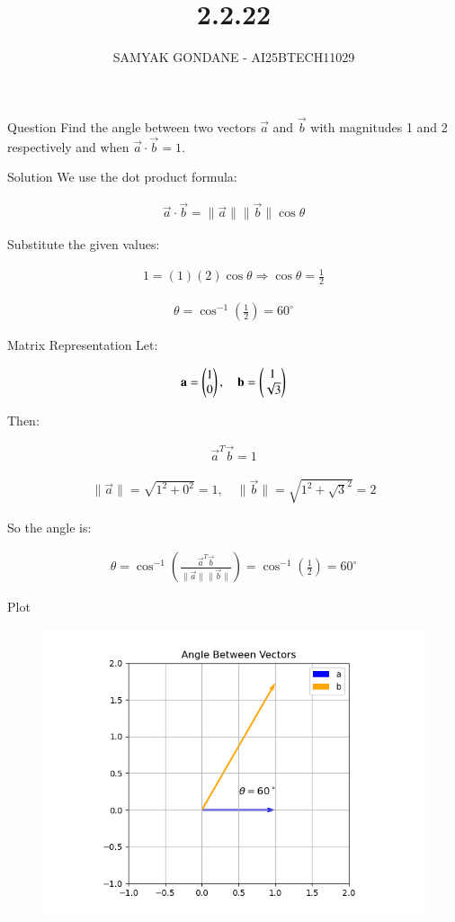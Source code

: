 \documentclass{beamer}
\title 
{2.2.22}
\date{}
\author
{SAMYAK GONDANE - AI25BTECH11029}
\begin{document}
\frame{\titlepage}

\begin{frame}{Question}
Find the angle between two vectors $\vec{a}$ and $\vec{b}$ with magnitudes 1 and 2 respectively and when $\vec{a} \cdot \vec{b} = 1$.
\end{frame}

\begin{frame}{Solution}
We use the dot product formula:


\begin{align}
\vec{a} \cdot \vec{b} = \|\vec{a}\| \|\vec{b}\| \cos\theta
\end{align}


Substitute the given values:


\begin{align}
1 = (1)(2)\cos\theta \Rightarrow \cos\theta = \frac{1}{2}
\end{align}




\begin{align}
\theta = \cos^{-1}\left(\frac{1}{2}\right) = 60^\circ
\end{align}


\end{frame}

\begin{frame}{Matrix Representation}
Let:


\begin{align}
\mathbf{a} = \begin{pmatrix}1 \\ 0\end{pmatrix}, \quad
\mathbf{b} = \begin{pmatrix}1 \\ \sqrt{3}\end{pmatrix}
\end{align}


Then:


\begin{align}
\vec{a}^T \vec{b} = 1
\end{align}




\begin{align}
\|\vec{a}\| = \sqrt{1^2 + 0^2} = 1, \quad
\|\vec{b}\| = \sqrt{1^2 + {\sqrt{3}}^2} = 2
\end{align}


So the angle is:


\begin{align}
\theta = \cos^{-1}\left(\frac{\vec{a}^T \vec{b}}{\|\vec{a}\| \|\vec{b}\|}\right)
= \cos^{-1}\left(\frac{1}{2}\right) = 60^\circ
\end{align}


\end{frame}

\begin{frame}{Plot}
    \begin{figure}[H]
        \centering
        \includegraphics[width=0.7\linewidth]{../figs/Figure_1.png}
        \caption{}
        \label{fig:fig1}
    \end{figure}
\end{frame}
\end{document}
